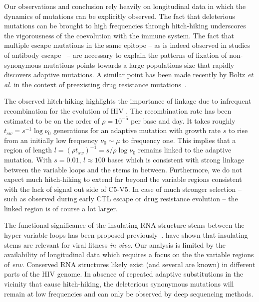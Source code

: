 \documentclass[rmp, twocolumn]{revtex4}
\newcommand{\env}{\textit{env}}
\begin{document}
Our observations and conclusion rely heavily on longitudinal data in which the
dynamics of mutations can be explicitly observed. The fact that deleterious
mutations can be brought to high frequencies through hitch-hiking underscores
the vigorousness of the coevolution with the immune system. The fact that
multiple escape mutations in the same epitope -- as is indeed observed in
studies of antibody escape~\citep{moore_limited_2009, bar_early_2012} -- are
necessary to explain the patterns of fixation of non-synonymous mutations points
towards a large populations size that rapidly discovers adaptive mutations. A
similar point has been made recently by Boltz {\it et al.} in the context of
preexisting drug resistance mutations~\citep{boltz_ultrasensitive_2012}. 

The observed hitch-hiking highlights the importance of linkage due to infrequent
recombination for the evolution of HIV
\citep{neher_recombination_2010,batorsky_estimate_2011,
josefsson_majority_2011}. The recombination rate has been estimated to be on the
order of $\rho = 10^{-5}$ per base and day. It takes roughly $t_{sw} = s^{-1}
\log \nu_0$ generations for an adaptive mutation with growth rate $s$ to rise
from an initially low frequency $\nu_0\sim \mu$ to frequency one. This implies
that a region of length $l = (\rho t_{sw})^{-1} = s/ \rho \log \nu_0$ remains
linked to the adaptive mutation. With $s=0.01$, $l\approx 100$ bases which is
consistent with strong linkage between the variable loops and the stems in
between. Furthermore, we do not expect much hitch-hiking to extend far beyond
the variable regions consistent with the lack of signal out side of C5-V5. In
case of much stronger selection -- such as observed during early CTL escape or
drug resistance evolution -- the linked  region is of course a lot larger. 

The functional significance of the insulating RNA structure stems between the
hyper variable loops has been proposed
previously~\citep{watts_architecture_2009, sanjuan_interplay_2011}.
\citet{sanjuan_interplay_2011} have shown that insulating stems are relevant for
viral fitness {\it in vivo}. Our analysis is limited by the availability of
longitudinal data which requires a focus on the the variable regions of \env.
Conserved RNA structures likely exist (and several are known) in different parts
of the HIV genome. In absence of repeated adaptive substitutions in the vicinity
that cause hitch-hiking, the deleterious synonymous mutations will remain at low
frequencies and can only be observed by deep sequencing methods. 
\end{document}

